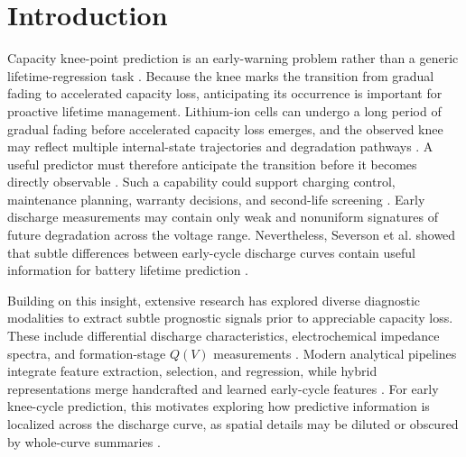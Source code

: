 \documentclass[pdflatex,sn-mathphys-num]{sn-jnl}
\begin{document}

\maketitle

\section{Introduction}\label{sec:introduction}

Capacity knee-point prediction is an early-warning problem rather than a generic lifetime-regression task \cite{sohn2022twostage}. Because the knee marks the transition from gradual fading to accelerated capacity loss, anticipating its occurrence is important for proactive lifetime management. Lithium-ion cells can undergo a long period of gradual fading before accelerated capacity loss emerges, and the observed knee may reflect multiple internal-state trajectories and degradation pathways \cite{attia2022knees}. A useful predictor must therefore anticipate the transition before it becomes directly observable \cite{fermincueto2020kneepoint}. Such a capability could support charging control, maintenance planning, warranty decisions, and second-life screening \cite{hu2020prognostics, sulzer2021fielddata}. Early discharge measurements may contain only weak and nonuniform signatures of future degradation across the voltage range. Nevertheless, Severson et al. showed that subtle differences between early-cycle discharge curves contain useful information for battery lifetime prediction \cite{severson2019data}.


Building on this insight, extensive research has explored diverse diagnostic modalities to extract subtle prognostic signals prior to appreciable capacity loss. These include differential discharge characteristics, electrochemical impedance spectra, and formation-stage $Q(V)$ measurements \cite{jiang2023predicting,zhang2020impedance,rhyu2025formation}. Modern analytical pipelines integrate feature extraction, selection, and regression, while hybrid representations merge handcrafted and learned early-cycle features \cite{fei2021framework,roman2021pipeline,fei2022earlystage}. For early knee-cycle prediction, this motivates exploring how predictive information is localized across the discharge curve, as spatial details may be diluted or obscured by whole-curve summaries \cite{li2021oneshot, strange2021onecycle, paulson2022feature}.
\end{document}
